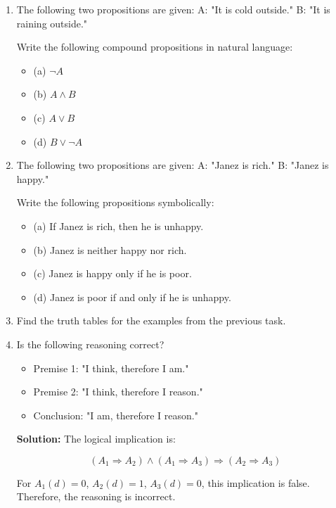 \documentclass[11pt,paper=b5,footinclude,headinclude]{scrbook} %
\theoremstyle{remark}
\theoremstyle{definition} %
\theoremstyle{theorem} %
\begin{document}
\begin{enumerate}
    \item 
The following two propositions are given:
A: "It is cold outside."
B: "It is raining outside."

Write the following compound propositions in natural language:
\begin{itemize}
    \item (a) $\neg A$
    \item (b) $A \land B$
    \item (c) $A \lor B$
    \item (d) $B \lor \neg A$
\end{itemize}

\item 
The following two propositions are given:
A: "Janez is rich."
B: "Janez is happy."

Write the following propositions symbolically:
\begin{itemize}
    \item (a) If Janez is rich, then he is unhappy.
    \item (b) Janez is neither happy nor rich.
    \item (c) Janez is happy only if he is poor.
    \item (d) Janez is poor if and only if he is unhappy.
\end{itemize}

\item 
Find the truth tables for the examples from the previous task.


\item
Is the following reasoning correct?

\begin{itemize}
    \item Premise 1: "I think, therefore I am."
    \item Premise 2: "I think, therefore I reason."
    \item Conclusion: "I am, therefore I reason."
\end{itemize}

\textbf{Solution:} The logical implication is:

\[
(A_1 \Rightarrow A_2) \land (A_1 \Rightarrow A_3) \Rightarrow (A_2 \Rightarrow A_3)
\]

For \( A_1(d) = 0 \), \( A_2(d) = 1 \), \( A_3(d) = 0 \), this implication is false. Therefore, the reasoning is incorrect.




\end{enumerate}
\end{document}
